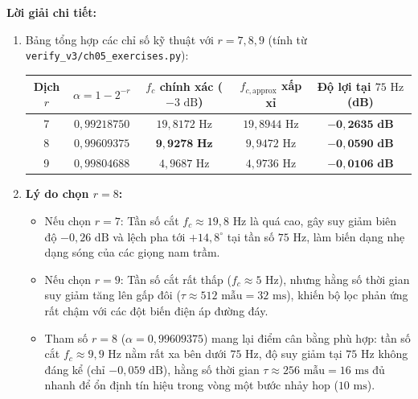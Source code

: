 \textbf{Lời giải chi tiết:}
\begin{enumerate}[label=(\alph*)]
    \item Bảng tổng hợp các chỉ số kỹ thuật với $r = 7, 8, 9$ (tính từ \texttt{verify\_v3/ch05\_exercises.py}):
    \begin{center}
    \begin{tabular}{ccccc}
    \toprule
    Dịch $r$ & $\alpha = 1 - 2^{-r}$ & $f_c$ chính xác ($-3\text{ dB}$) & $f_{c,\text{approx}}$ xấp xỉ & Độ lợi tại $75\text{ Hz}$ (dB) \\
    \midrule
    7 & $0{,}99218750$ & $19{,}8172\text{ Hz}$ & $19{,}8944\text{ Hz}$ & $\mathbf{-0{,}2635\text{ dB}}$ \\
    8 & $0{,}99609375$ & $\mathbf{9{,}9278\text{ Hz}}$  & $9{,}9472\text{ Hz}$  & $\mathbf{-0{,}0590\text{ dB}}$ \\
    9 & $0{,}99804688$ & $4{,}9687\text{ Hz}$  & $4{,}9736\text{ Hz}$  & $\mathbf{-0{,}0106\text{ dB}}$ \\
    \bottomrule
    \end{tabular}
    \end{center}

    \item \textbf{Lý do chọn $r = 8$:}
    \begin{itemize}[leftmargin=1.5em, itemsep=2pt]
        \item Nếu chọn $r = 7$: Tần số cắt $f_c \approx 19{,}8\text{ Hz}$ là quá cao, gây suy giảm biên độ $-0{,}26\text{ dB}$ và lệch pha tới $+14{,}8^\circ$ tại tần số $75\text{ Hz}$, làm biến dạng nhẹ dạng sóng của các giọng nam trầm.
        \item Nếu chọn $r = 9$: Tần số cắt rất thấp ($f_c \approx 5\text{ Hz}$), nhưng hằng số thời gian suy giảm tăng lên gấp đôi ($\tau \approx 512\text{ mẫu} = 32\text{ ms}$), khiến bộ lọc phản ứng rất chậm với các đột biến điện áp đường đáy.
        \item Tham số $r = 8$ ($\alpha = 0{,}99609375$) mang lại điểm cân bằng phù hợp: tần số cắt $f_c \approx 9{,}9\text{ Hz}$ nằm rất xa bên dưới $75\text{ Hz}$, độ suy giảm tại $75\text{ Hz}$ không đáng kể (chỉ $-0{,}059\text{ dB}$), hằng số thời gian $\tau \approx 256\text{ mẫu} = 16\text{ ms}$ đủ nhanh để ổn định tín hiệu trong vòng một bước nhảy hop ($10\text{ ms}$).
    \end{itemize}


\end{enumerate}
